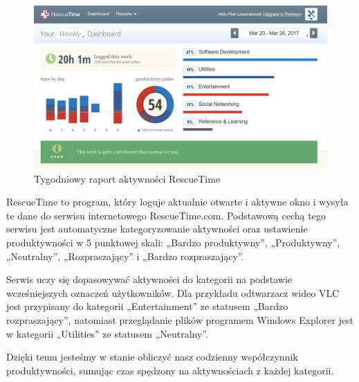\documentclass[openright]{xmgr}
\begin{document}
        \begin{figure}
          \includegraphics[width=\linewidth]{fig/rescuetime-dashboard.png}
          \caption{Tygodniowy raport aktywności RescueTime}
          \label{fig:rescuetime-dashboard}
        \end{figure}

            RescueTime to program, który loguje aktualnie otwarte i aktywne okno
            i wysyła te dane do serwisu internetowego RescueTime.com.
            Podstawową cechą tego serwisu jest automatyczne kategoryzowanie aktywności oraz ustawienie produktywności w 5 punktowej skali:
            „Bardzo produktywny”, „Produktywny”, „Neutralny”, „Rozpraszający” i „Bardzo rozpraszający”.

            Serwis uczy się dopasowywać aktywności do kategorii na podstawie wcześniejszych oznaczeń użytkowników.
            Dla przykładu odtwarzacz wideo VLC jest przypisany do kategorii „Entertainment” ze statusem „Bardzo rozpraszający”,
            natomiast przeglądanie plików programem Windows Explorer jest w kategorii „Utilities” ze statusem „Neutralny”.

            Dzięki temu jesteśmy w stanie obliczyć nasz codzienny współczynnik produktywności,
            sumując czas spędzony na aktywnościach z każdej kategorii.
\end{document}
